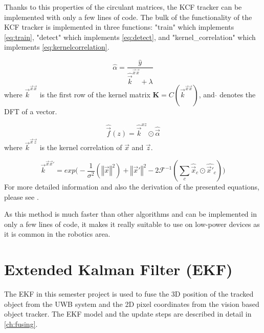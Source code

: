 Thanks to this properties of the circulant matrices, the \ac{KCF} tracker can be implemented with only a few lines of code. The bulk of the functionality of the \ac{KCF} tracker is implemented in three functions: "train" which implements \autoref{eq:train}, "detect" which implements \autoref{eq:detect}, and "kernel\_correlation" which implements \autoref{eq:kernelcorrelation}.

\begin{equation}\label{eq:train}
	\hat{\alpha} = \frac{\hat{y}}{\hat{\vec{k}}^{\vec x \vec x} + \lambda}
\end{equation}
where $\vec{k}^{\vec x \vec x}$ is the first row of the kernel matrix $\textbf{K}=C(\vec{k}^{\vec x \vec x})$, and $\hat{}$ denotes the DFT of a vector.

\begin{equation}\label{eq:detect}
	\hat{\vec f}(z) = \hat{\vec k}^{xz} \odot \hat{\vec \alpha}
\end{equation}
where $\vec k^{\vec x \vec z}$ is the kernel correlation of $\vec x$ and $\vec z$.

\begin{equation}\label{eq:kernelcorrelation}
	\vec{k}^{\vec x\vec x'} = \mathit{exp} \big( -\frac{1}{\sigma^2} (\left\Vert \vec x \right\Vert^2) + \left\Vert \vec x' \right\Vert^2 -2\mathcal{F}^{-1}(\sum_c \hat{\vec x}_c \odot \hat{\vec x'}_c) \big)
\end{equation}
For more detailed information and also the derivation of the presented equations, please see \cite{henriques2015tracking}.

As this method is much faster than other algorithms and can be implemented in only a few lines of code, it makes it really suitable to use on low-power devices as it is common in the robotics area.

\section{Extended Kalman Filter (EKF)}
The \acf{EKF} \cite{Chui2009} in this semester project is used to fuse the 3D position of the tracked object from the \ac{UWB} system and the 2D pixel coordinates from the vision based object tracker. The \ac{EKF} model and the update steps are described in detail in \autoref{ch:fusing}.